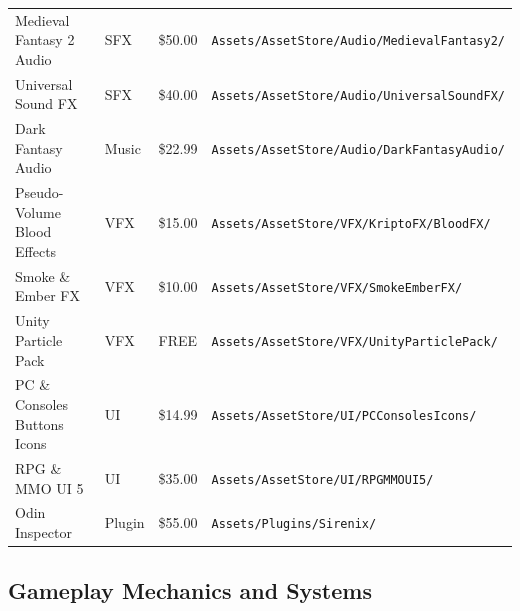 \begin{table}[!h]
\begin{center}
\begin{tabular}{ >{\small}w{l}{11em} >{\small}w{c}{4em} >{\small}w{c}{3em} m{13em} }
      Medieval Fantasy 2 Audio     & SFX       &  \$50.00 & \texttt{\tiny Assets/AssetStore/Audio/MedievalFantasy2/} \\ 
      Universal Sound FX           & SFX       &  \$40.00 & \texttt{\tiny Assets/AssetStore/Audio/UniversalSoundFX/} \\
      \midrule
      Dark Fantasy Audio           & Music     &  \$22.99 & \texttt{\tiny Assets/AssetStore/Audio/DarkFantasyAudio/} \\
      \midrule
      Pseudo-Volume Blood Effects  & VFX       &  \$15.00 & \texttt{\tiny Assets/AssetStore/VFX/KriptoFX/BloodFX/}   \\ 
      Smoke \& Ember FX            & VFX       &  \$10.00 & \texttt{\tiny Assets/AssetStore/VFX/SmokeEmberFX/}       \\ 
      Unity Particle Pack          & VFX       &     FREE & \texttt{\tiny Assets/AssetStore/VFX/UnityParticlePack/}  \\
      \midrule
      PC \& Consoles Buttons Icons & UI        &  \$14.99 & \texttt{\tiny Assets/AssetStore/UI/PCConsolesIcons/}     \\ 
      RPG \& MMO UI 5              & UI        &  \$35.00 & \texttt{\tiny Assets/AssetStore/UI/RPGMMOUI5/}           \\
      \midrule
      Odin Inspector               & Plugin    &  \$55.00 & \texttt{\tiny Assets/Plugins/Sirenix/}                   \\ 
      \bottomrule
    \end{tabular}
  \end{center}
\end{table}

\subsection{Gameplay Mechanics and Systems}

